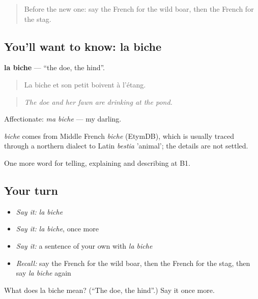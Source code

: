 \label{lesson:FR-C459-biche}



\begin{quote}
Before the new one: say the French for the wild boar, then the French for the stag.
\end{quote}

\subsection*{You'll want to know: la biche}
\textbf{la biche} — \textquotedblleft{}the doe, the hind\textquotedblright{}.

\begin{quote}
La biche et son petit boivent à l'étang.
\end{quote}

\begin{quote}
\emph{The doe and her fawn are drinking at the pond.}
\end{quote}

Affectionate: \emph{ma biche} — my darling.

\begin{cousinweb}
\emph{biche} comes from Middle French \emph{biche} (EtymDB), which is usually traced through a northern dialect to Latin \emph{bestia} 'animal'; the details are not settled.
\end{cousinweb}

\begin{grammarlens}[title={What you've built}]
One more word for telling, explaining and describing at B1.
\end{grammarlens}

\subsection*{Your turn}
\begin{itemize}
\raggedright
  \item \emph{Say it:} \emph{la biche}
  \item \emph{Say it:} \emph{la biche}, once more
  \item \emph{Say it:} a sentence of your own with \emph{la biche}
  \item \emph{Recall:} say the French for the wild boar, then the French for the stag, then say \emph{la biche} again
\end{itemize}

\begin{tcolorbox}[breakable,colback=teal!4,colframe=teal!35!black,title={Before you move on}]
What does la biche mean? (\textquotedblleft{}The doe, the hind\textquotedblright{}.) Say it once more.
\end{tcolorbox}
